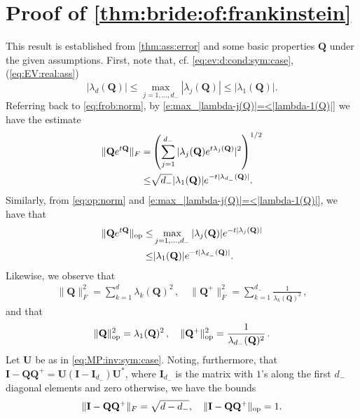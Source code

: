 \documentclass[9pt,twocolumn,twoside]{pnas-new}
\newcommand{\?}{\textbf{?}}
\newcommand{\op}{\textnormal{op}}
\newcommand{\QQ}{\mathbf{Q}}
\newcommand{\II}{\mathbf{I}}
\newcommand{\UU}{\mathbf{U}}
\begin{document}
\section{Proof of \cref{thm:bride:of:frankinstein}}

This result is established from \cref{thm:ass:error} and some basic
properties $\QQ$ under the given assumptions. First, note that, cf.
\eqref{eq:ev:d:cond:sym:case}, (\ref{eq:EV:real:ass})
\begin{equation}\label{e:max_|lambda-j(Q)|=<|lambda-1(Q)|}
  |\lambda_d(\QQ)| \leq \max_{j =1, \ldots,d_{-}} |\lambda_{j}(\QQ)| \leq |\lambda_1(\QQ)|.
\end{equation}
Referring back to
\eqref{eq:frob:norm}, by \eqref{e:max_|lambda-j(Q)|=<|lambda-1(Q)|} we have the estimate
\begin{align}\label{eq:frob:sucks}
  \| \QQ e^{t\QQ} \|_F
  =&  \left( \sum_{j =1}^{d_{-}}
     | \lambda_j(\QQ) e^{ t  \lambda_j(\QQ)  } |^2 \right)^{1/2}
     \notag\\
  \leq& \sqrt{d_{-}} |\lambda_{1}(\QQ)| e^{-t |\lambda_{d_{-}}(\QQ)|}.
\end{align}
Similarly, from \eqref{eq:op:norm} and \eqref{e:max_|lambda-j(Q)|=<|lambda-1(Q)|}, we have that
\begin{align}\label{eq:op:better}
  \| \QQ e^{t\QQ} \|_{\op}
  \leq& \max_{j =1, \ldots,d_{-}}
        |\lambda_{j}(\QQ)| e^{-t |\lambda_{j}(\QQ)|}
        \notag\\
  \leq& |\lambda_{1}(\QQ)| e^{-t |\lambda_{d_{-}}(\QQ)|}.
\end{align}
Likewise, we observe that
\begin{align}\label{eq:thm1:extra:trms:1:F}
  \lVert \QQ\rVert^2_F = \sum_{k=1}^{d} \lambda_k(\QQ)^2 \, , \quad
  \lVert \QQ^+ \rVert^2_F = \sum_{k =1}^{d_-}\frac{1}{\lambda_k(\QQ)^2} \, ,
\end{align}
and that
\begin{align}\label{eq:thm1:extra:trms:1:F}
  \lVert \QQ\rVert^2_{\op} = \lambda_1(\QQ)^2 \, , \quad
  \lVert \QQ^+ \rVert^2_{\op} = \frac{1}{\lambda_{d_{-}}(\QQ)^2} \,.
\end{align}
Let $\UU$ be as in \eqref{eq:MP:inv:sym:case}. Noting, furthermore,
that $\II - \QQ \QQ^+ = \UU(\II - \II_{d_-})\UU^*$, where $\II_{d_-}$
is the matrix with $1$'s along the first $d_-$ diagonal elements and
zero otherwise, we have the bounds
\begin{align}\label{eq:proj:mat:bnds}
  \|\II - \QQ  \QQ^+\|_{F} = \sqrt{d - d_{-}},
  \quad
  \| \II - \QQ  \QQ^+\|_{\op} = 1.
\end{align}
\end{document}
